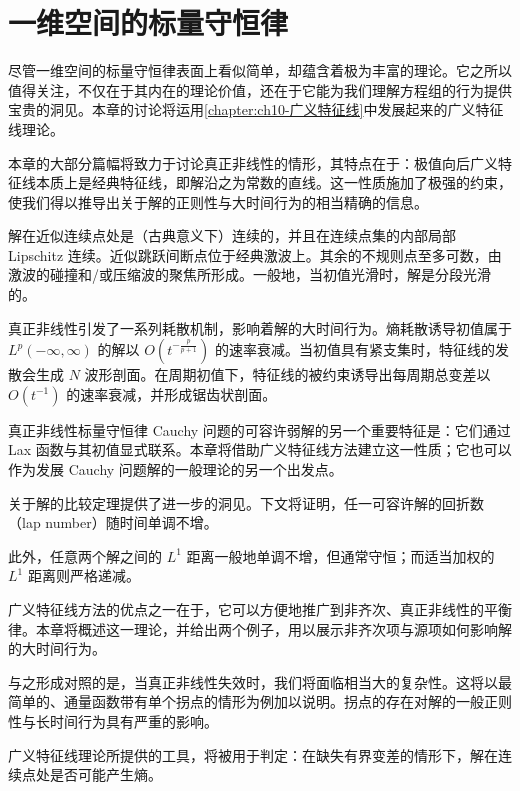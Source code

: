 \documentclass[../main.tex]{subfiles}
\begin{document}
\chapter{一维空间的标量守恒律}\label{chapter:ch11-一维标量守恒律}

尽管一维空间的标量守恒律表面上看似简单，却蕴含着极为丰富的理论。它之所以值得关注，不仅在于其内在的理论价值，还在于它能为我们理解方程组的行为提供宝贵的洞见。本章的讨论将运用\cref{chapter:ch10-广义特征线}中发展起来的广义特征线理论。


本章的大部分篇幅将致力于讨论真正非线性的情形，其特点在于：极值向后广义特征线本质上是经典特征线，即解沿之为常数的直线。这一性质施加了极强的约束，使我们得以推导出关于解的正则性与大时间行为的相当精确的信息。

解在近似连续点处是（古典意义下）连续的，并且在连续点集的内部局部 Lipschitz 连续。近似跳跃间断点位于经典激波上。其余的不规则点至多可数，由激波的碰撞和/或压缩波的聚焦所形成。一般地，当初值光滑时，解是分段光滑的。

真正非线性引发了一系列耗散机制，影响着解的大时间行为。熵耗散诱导初值属于 $L^{p}(-\infty,\infty)$ 的解以 $O(t^{-\frac{p}{p+1}})$ 的速率衰减。当初值具有紧支集时，特征线的发散会生成 $N$ 波形剖面。在周期初值下，特征线的被约束诱导出每周期总变差以 $O(t^{-1})$ 的速率衰减，并形成锯齿状剖面。

真正非线性标量守恒律 Cauchy 问题的可容许弱解的另一个重要特征是：它们通过 Lax 函数与其初值显式联系。本章将借助广义特征线方法建立这一性质；它也可以作为发展 Cauchy 问题解的一般理论的另一个出发点。

关于解的比较定理提供了进一步的洞见。下文将证明，任一可容许解的回折数（lap number）随时间单调不增。

此外，任意两个解之间的 $L^{1}$ 距离一般地单调不增，但通常守恒；而适当加权的 $L^{1}$ 距离则严格递减。

广义特征线方法的优点之一在于，它可以方便地推广到非齐次、真正非线性的平衡律。本章将概述这一理论，并给出两个例子，用以展示非齐次项与源项如何影响解的大时间行为。

与之形成对照的是，当真正非线性失效时，我们将面临相当大的复杂性。这将以最简单的、通量函数带有单个拐点的情形为例加以说明。拐点的存在对解的一般正则性与长时间行为具有严重的影响。

广义特征线理论所提供的工具，将被用于判定：在缺失有界变差的情形下，解在连续点处是否可能产生熵。















\end{document}
